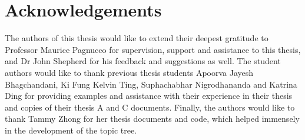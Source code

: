 \chapter*{Acknowledgements}\label{ack}

The authors of this thesis would like to extend their deepest gratitude to Professor Maurice Pagnucco for supervision, support and assistance to this thesis, and Dr John Shepherd for his feedback and suggestions as well.
The student authors would like to thank previous thesis students Apoorva Jayesh Bhagchandani, Ki Fung Kelvin Ting, Suphachabhar Nigrodhananda and Katrina Ding for providing examples and assistance with their experience in their thesis and copies of their thesis A and C documents. Finally, the authors would like to thank Tammy Zhong for her thesis documents and code, which helped immensely in the development of the topic tree.

